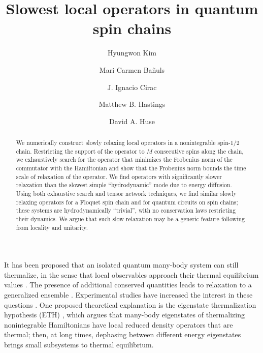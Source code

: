 \documentclass[twocolumn,superscriptaddress, prl,showpacs]{revtex4-1}
\begin{document}
\title{Slowest local operators in quantum spin chains}

\author{Hyungwon Kim}

\author{Mari Carmen Ba\~{n}uls}

\author{J. Ignacio Cirac}

\author{Matthew B. Hastings}

\author{David A. Huse}

\begin{abstract}
We numerically construct slowly relaxing local operators in a nonintegrable spin-1/2 chain.
Restricting the support of the operator to $M$ consecutive spins along the chain,
we exhaustively search for the operator that minimizes the Frobenius norm of the commutator
with the Hamiltonian and show that the Frobenius norm bounds the time scale of relaxation of the operator.
We find
operators with significantly slower relaxation than
the slowest simple ``hydrodynamic'' mode due to energy diffusion.
Using both exhaustive search and tensor network techniques, we find
similar slowly relaxing operators for a Floquet spin chain and for quantum circuits on spin chains;
these systems are hydrodynamically ``trivial'', with no conservation laws restricting their dynamics.
We argue that such slow relaxation may be a generic feature following from locality and unitarity.
\end{abstract}


\maketitle

It has been proposed that an isolated quantum many-body system can still thermalize, in the sense that local observables approach their thermal equilibrium values \cite{Deutsch:1991,Srednicki:1994,Rigol:2008}.  The presence of additional conserved quantities leads to relaxation to a generalized ensemble \cite{Rigol:2007,Calabrese:2011,Gogolin:2011,Fagotti:2014}.  Experimental studies have increased the interest in these questions \cite{Polkovnikov:2011, Yukalov:2011}.  One proposed theoretical explanation is the eigenstate thermalization hypothesis (ETH) \cite{Deutsch:1991,Srednicki:1994,Rigol:2008,Santos:2010,Rigol:2012,Kruczenski:2013,Beugeling:2014,Sorg:2014,Kim_ETH,Goldstein:2014}, which argues that many-body eigenstates of thermalizing nonintegrable Hamiltonians have local reduced density operators that are thermal; then, at long times, dephasing between different energy eigenstates brings small subsystems to thermal equilibrium.
\end{document}
